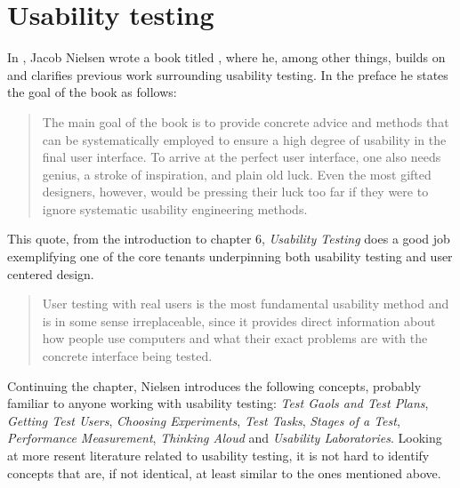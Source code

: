 

\section{Usability testing}

  In \citeyear{citeHeuristicsNielsenUsabilityEngineering}, Jacob Nielsen wrote a
  book titled %
  \cite{citeHeuristicsNielsenUsabilityEngineering}, where he, among other
  things, builds on and clarifies previous work surrounding usability testing.
  In the preface he states the goal of the book as follows:

  \begin{quote}
    The main goal of the book is to provide concrete advice and
    methods that can be systematically employed to ensure a high
    degree of usability in the final user interface. To arrive at the perfect
    user interface, one also needs genius, a stroke of inspiration, and
    plain old luck. Even the most gifted designers, however, would be
    pressing their luck too far if they were to ignore systematic usability
    engineering methods.
  \end{quote}

  This quote, from the introduction to chapter 6,
  \textit{Usability Testing}%
  \cite[p. 165]{citeHeuristicsNielsenUsabilityEngineering}
  does a good job exemplifying one of the core tenants underpinning both
  usability testing and user centered design.

  \begin{quote}
    User testing with real users is the most fundamental usability method and
    is in some sense irreplaceable, since it provides direct information about
    how people use computers and what their exact problems are with the
    concrete interface being tested.
  \end{quote}

  Continuing the chapter, Nielsen introduces the following concepts, probably
  familiar to anyone working with usability testing:
  \textit{Test Gaols and Test Plans},
  \textit{Getting Test Users},
  \textit{Choosing Experiments},
  \textit{Test Tasks},
  \textit{Stages of a Test},
  \textit{Performance Measurement},
  \textit{Thinking Aloud} and
  \textit{Usability Laboratories}.
  Looking at more resent literature related to usability testing, it is not
  hard to identify concepts that are, if not identical, at least similar to the
  ones mentioned above.

